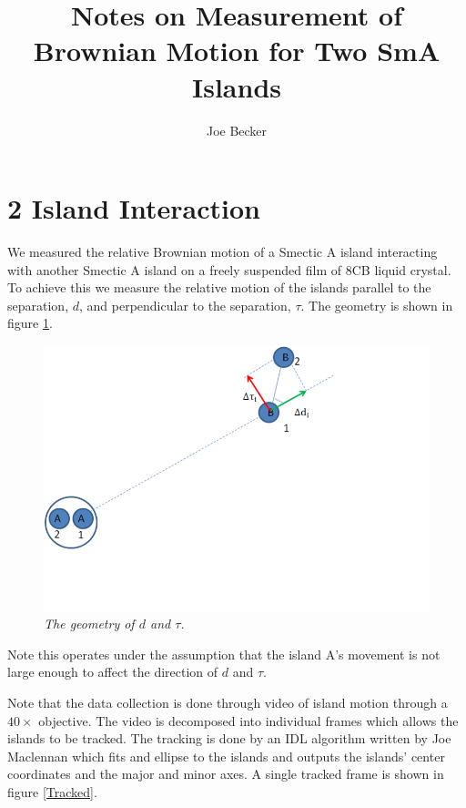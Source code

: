 \documentclass[11pt]{article}
\title{Notes on Measurement of Brownian Motion for Two SmA Islands}
\author{Joe Becker}
\begin{document}
\maketitle

\section{2 Island Interaction}
We measured the relative Brownian motion of a Smectic A island interacting with another Smectic A island on a freely suspended film of 8CB liquid crystal. To achieve this we measure the relative motion of the islands parallel to the separation, $d$, and perpendicular to the separation, $\tau$. The geometry is shown in figure \ref{DTauFig}.

\begin{figure}
\centering
\includegraphics[scale=0.4]{Images/DTauFigure.png}
\caption{\textit{The geometry of $d$ and $\tau$.}}
\label{DTauFig}
\end{figure}

Note this operates under the assumption that the island A's movement is not large enough to affect the direction of $d$ and $\tau$. 

Note that the data collection is done through video of island motion through a $40\times$ objective. The video is decomposed into individual frames which allows the islands to be tracked. The tracking is done by an IDL algorithm written by Joe Maclennan which fits and ellipse to the islands and outputs the islands' center coordinates and the major and minor axes. A single tracked frame is shown in figure \ref{Tracked}.
\end{document}
